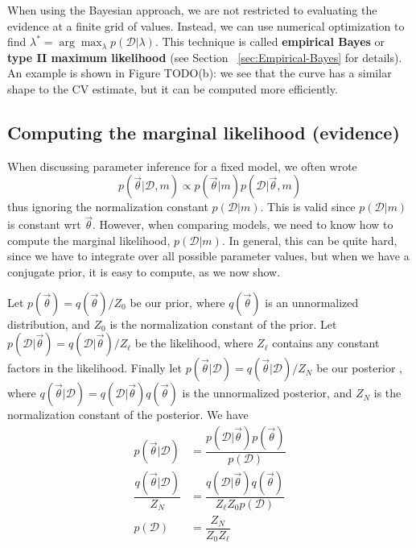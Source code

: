 When using the Bayesian approach, we are not restricted to evaluating the evidence at a finite grid of values. Instead, we can use numerical optimization to find $\lambda^*=\arg\max_{\lambda}p(\mathcal{D}|\lambda)$. This technique is called \textbf{empirical Bayes} or \textbf{type II maximum likelihood} (see Section ~\ref{sec:Empirical-Bayes} for details). An example is shown in Figure TODO(b): we see that the curve has a similar shape to the CV estimate, but it can be computed more efficiently.


\subsection{Computing the marginal likelihood (evidence)}
\label{sec:Computing-the-marginal-likelihood}
When discussing parameter inference for a fixed model, we often wrote
\begin{equation}
p(\vec{\theta}|\mathcal{D},m) \propto p(\vec{\theta}|m)p(\mathcal{D}|\vec{\theta},m)
\end{equation}
thus ignoring the normalization constant $p(\mathcal{D}|m)$. This is valid since $p(\mathcal{D}|m)$is constant wrt $\vec{\theta}$. However, when comparing models, we need to know how to compute the marginal likelihood, $p(\mathcal{D}|m)$. In general, this can be quite hard, since we have to integrate over all possible parameter values, but when we have a conjugate prior, it is easy to compute, as we now show.

Let $p(\vec{\theta})=q(\vec{\theta})/Z_0$ be our prior, where $q(\vec{\theta})$ is an unnormalized distribution, and $Z_0$ is the normalization constant of the prior. Let $p(\mathcal{D}|\vec{\theta})=q(\mathcal{D}|\vec{\theta})/Z_{\ell}$ be the likelihood, where $Z_{\ell}$ contains any constant factors in the likelihood. Finally let $p(\vec{\theta}|\mathcal{D})=q(\vec{\theta}|\mathcal{D})/Z_N$ be our posterior , where $q(\vec{\theta}|\mathcal{D})=q(\mathcal{D}|\vec{\theta})q(\vec{\theta})$ is the unnormalized posterior, and $Z_N$ is the normalization constant of the posterior. We have
\begin{align}
p(\vec{\theta}|\mathcal{D})& =\dfrac{p(\mathcal{D}|\vec{\theta})p(\vec{\theta})}{p(\mathcal{D})} \\
\dfrac{q(\vec{\theta}|\mathcal{D})}{Z_N}& =\dfrac{q(\mathcal{D}|\vec{\theta})q(\vec{\theta})}{Z_{\ell}Z_0p(\mathcal{D})} \\
p(\mathcal{D})& = \dfrac{Z_N}{Z_0Z_{\ell}}
\end{align}

